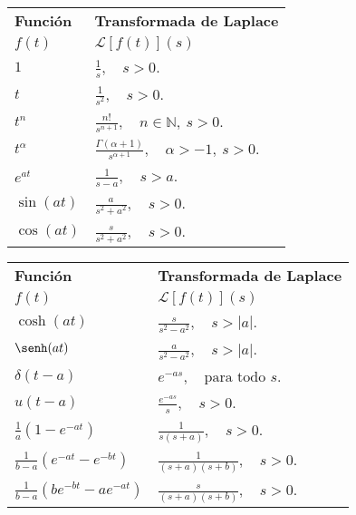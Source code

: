 \documentclass[a4,10pt,comentarios]{aleph-notas}
\newcommand{\lap}[2][s]{\displaystyle \mathscr{L} \left[#2\right](#1)}
\begin{document}
\begin{center}
\begin{tabular}{@{}ll@{}}
    \toprule
        \textbf{Función} & \textbf{Transformada de Laplace} \\
         $f(t)$ & $\lap{f(t)}$ \\
    \midrule
        $1$
        & $\displaystyle \frac{1}{s}, \quad s>0$.
        \\[6mm]
        $t$
        & $\displaystyle \frac{1}{s^2}, \quad s>0$.
        \\[6mm]
        $t^n$ 
        & $\displaystyle \frac{n!}{s^{n+1}}, \quad n \in \mathbb{N},\ s>0$. 
        \\[6mm]
        $t^\alpha$ 
        & $\displaystyle \frac{\Gamma(\alpha+1)}{s^{\alpha+1}}, \quad \alpha>-1,\ s>0$. 
        \\[6mm]
        $e^{at}$ 
        & $\displaystyle \frac{1}{s-a}, \quad s>a$. 
        \\[6mm]
        $\sin(at)$ 
        & $\displaystyle \frac{a}{s^2+a^2}, \quad s>0$. 
        \\[6mm]
        $\cos(at)$ 
        & $\displaystyle \frac{s}{s^2+a^2}, \quad s>0$. 
        \\
    \bottomrule
\end{tabular}
%
\hspace{8mm}
%
\begin{tabular}{@{}ll@{}}
    \toprule
        \textbf{Función} & \textbf{Transformada de Laplace} \\
         $f(t)$ & $\lap{f(t)}$ \\
    \midrule
        $\cosh(at)$ 
        & $\displaystyle \frac{s}{s^2-a^2}, \quad s>|a|$. 
        \\[6mm]
        $\senh(at)$ 
        & $\displaystyle \frac{a}{s^2-a^2}, \quad s>|a|$. 
        \\[6mm]
        $\delta(t-a)$ 
        & $\displaystyle e^{-as}, \quad \text{para todo } s$. 
        \\[6mm]
        $u(t-a)$ 
        & $\displaystyle \frac{e^{-as}}{s}, \quad s>0$.
        \\[6mm]
        $\displaystyle\frac{1}{a}\left(1-e^{-at}\right)$
        & $\displaystyle \frac{1}{s(s+a)}, \quad s>0$.
        \\[6mm]
        $\displaystyle\frac{1}{b-a}\left(e^{-at}-e^{-bt}\right)$
        & $\displaystyle \frac{1}{(s+a)(s+b)}, \quad s>0$.
        \\[6mm]
        $\displaystyle\frac{1}{b-a}\left(be^{-bt}-ae^{-at}\right)$
        & $\displaystyle \frac{s}{(s+a)(s+b)}, \quad s>0$.
        \\
    \bottomrule
\end{tabular}
\end{center}
\end{document}
